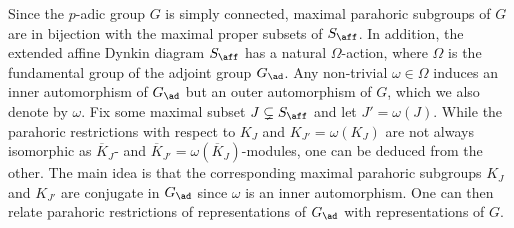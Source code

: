 


Since the $p$-adic group $G$ is simply connected, maximal parahoric subgroups of $G$ are in bijection with the maximal proper subsets of $S_{\aff}$. In addition, the extended affine Dynkin diagram $S_{\aff}$ has a natural $\Omega$-action, where $\Omega$ is the fundamental group of the adjoint group $G_{\ad}$. Any non-trivial $\omega\in\Omega$ induces an inner automorphism of $G_{\ad}$ but an outer automorphism of $G$, which we also denote by $\omega$. Fix some maximal subset $J\subsetneq S_{\aff}$ and let $J'=\omega(J)$. While the parahoric restrictions with respect to $K_J$ and $K_{J'}=\omega(K_J)$ are not always isomorphic as $\overline{K}_J$- and $\overline{K}_{J'}=\omega(\overline{K}_J)$-modules, one can be deduced from the other. The main idea is that the corresponding maximal parahoric subgroups $K_J$ and $K_{J'}$ are conjugate in $G_{\ad}$ since $\omega$ is an inner automorphism. One can then relate parahoric restrictions of representations of $G_{\ad}$ with representations of $G$.

